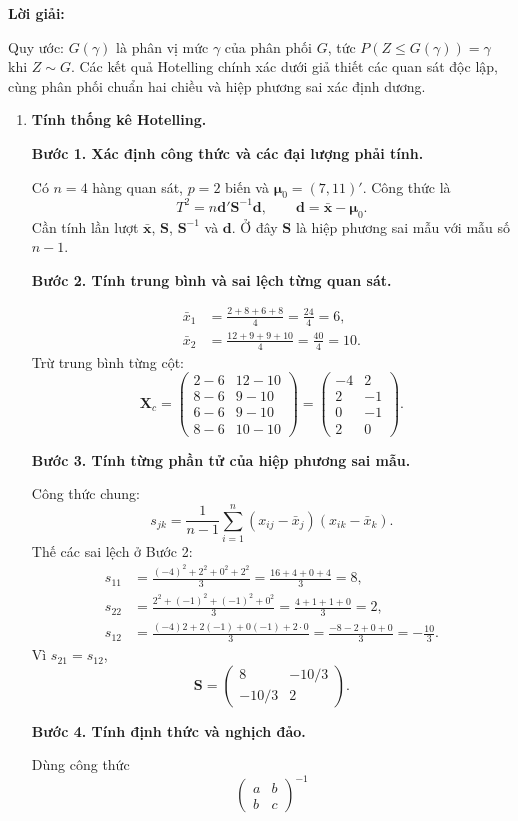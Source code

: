 \documentclass[11pt,a4paper]{article}
\renewcommand{\boldsymbol}[1]{\symbf{#1}}
\newenvironment{solution}{%
  \par\medskip\noindent\textbf{Lời giải:}\par\nobreak\smallskip\noindent\ignorespaces
}{\par}
\newcommand{\step}[2]{\par\medskip\noindent\textbf{Bước #1. #2}\par\nopagebreak[4]\smallskip\noindent}
\begin{document}
\begin{solution}
Quy ước: $G(\gamma)$ là phân vị mức $\gamma$ của phân phối $G$,
tức $P(Z\le G(\gamma))=\gamma$ khi $Z\sim G$.
Các kết quả Hotelling chính xác dưới giả thiết các quan sát độc lập,
cùng phân phối chuẩn hai chiều và hiệp phương sai xác định dương.
\begin{enumerate}[label=\textbf{\alph*)}]
\item \textbf{Tính thống kê Hotelling.}\par\nopagebreak[4]
\step{1}{Xác định công thức và các đại lượng phải tính.}
Có $n=4$ hàng quan sát, $p=2$ biến và $\boldsymbol{\mu}_0=(7,11)'$.
Công thức là
\[
T^2=n\mathbf{d}'\mathbf{S}^{-1}\mathbf{d},\qquad
\mathbf{d}=\bar{\mathbf{x}}-\boldsymbol{\mu}_0.
\]
Cần tính lần lượt $\bar{\mathbf{x}}$, $\mathbf{S}$, $\mathbf{S}^{-1}$ và $\mathbf{d}$.
Ở đây $\mathbf{S}$ là hiệp phương sai mẫu với mẫu số $n-1$.
\step{2}{Tính trung bình và sai lệch từng quan sát.}
\begin{align*}
\bar{x}_1&=\frac{2+8+6+8}{4}=\frac{24}{4}=6,\\
\bar{x}_2&=\frac{12+9+9+10}{4}=\frac{40}{4}=10.
\end{align*}
Trừ trung bình từng cột:
\[
\mathbf{X}_c=\begin{pmatrix}
2-6&12-10\\8-6&9-10\\6-6&9-10\\8-6&10-10
\end{pmatrix}
=\begin{pmatrix}-4&2\\2&-1\\0&-1\\2&0\end{pmatrix}.
\]
\step{3}{Tính từng phần tử của hiệp phương sai mẫu.}
Công thức chung:
\[
s_{jk}=\frac1{n-1}\sum_{i=1}^n(x_{ij}-\bar{x}_j)(x_{ik}-\bar{x}_k).
\]
Thế các sai lệch ở Bước 2:
\begin{align*}
s_{11}&=\frac{(-4)^2+2^2+0^2+2^2}{3}
=\frac{16+4+0+4}{3}=8,\\
s_{22}&=\frac{2^2+(-1)^2+(-1)^2+0^2}{3}
=\frac{4+1+1+0}{3}=2,\\
s_{12}&=\frac{(-4)2+2(-1)+0(-1)+2\cdot0}{3}
=\frac{-8-2+0+0}{3}=-\frac{10}{3}.
\end{align*}
Vì $s_{21}=s_{12}$,
\[
\mathbf{S}=\begin{pmatrix}8&-10/3\\-10/3&2\end{pmatrix}.
\]
\step{4}{Tính định thức và nghịch đảo.}
Dùng công thức
\[
\begin{pmatrix}a&b\\b&c\end{pmatrix}^{-1}
\]
\end{enumerate}
\end{solution}
\end{document}
